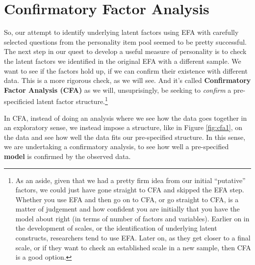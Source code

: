 \documentclass[
]{book}
\begin{document}
\hypertarget{CFA}{%
\section{Confirmatory Factor Analysis}\label{CFA}}

So, our attempt to identify underlying latent factors using EFA with carefully selected questions from the personality item pool seemed to be pretty successful. The next step in our quest to develop a useful measure of personality is to check the latent factors we identified in the original EFA with a different sample. We want to see if the factors hold up, if we can confirm their existence with different data. This is a more rigorous check, as we will see. And it's called {\textbf{Confirmatory Factor Analysis (CFA)}} as we will, unsuprisingly, be seeking to \emph{confirm} a pre-specificied latent factor structure.\footnote{As an aside, given that we had a pretty firm idea from our initial ``putative'' factors, we could just have gone straight to CFA and skipped the EFA step. Whether you use EFA and then go on to CFA, or go straight to CFA, is a matter of judgement and how confident you are initially that you have the model about right (in terms of number of factors and variables). Earlier on in the development of scales, or the identification of underlying latent constructs, researchers tend to use EFA. Later on, as they get closer to a final scale, or if they want to check an established scale in a new sample, then CFA is a good option.}

In CFA, instead of doing an analysis where we see how the data goes together in an exploratory sense, we instead impose a structure, like in Figure \ref{fig:cfa1}, on the data and see how well the data fits our pre-specified structure. In this sense, we are undertaking a confirmatory analysis, to see how well a pre-specified {\textbf{model}} is confirmed by the observed data.
\end{document}
